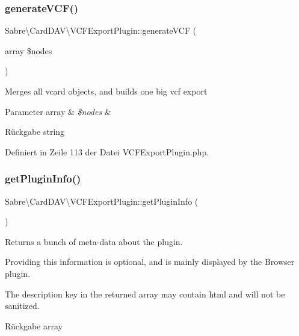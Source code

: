 \subsubsection{\texorpdfstring{generate\+V\+C\+F()}{generateVCF()}}
{\footnotesize\ttfamily Sabre\textbackslash{}\+Card\+D\+A\+V\textbackslash{}\+V\+C\+F\+Export\+Plugin\+::generate\+V\+CF (\begin{DoxyParamCaption}\item[{array}]{\$nodes }\end{DoxyParamCaption})}

Merges all vcard objects, and builds one big vcf export


\begin{DoxyParams}[1]{Parameter}
array & {\em \$nodes} & \\
\hline
\end{DoxyParams}
\begin{DoxyReturn}{Rückgabe}
string 
\end{DoxyReturn}


Definiert in Zeile 113 der Datei V\+C\+F\+Export\+Plugin.\+php.

\mbox{\label{class_sabre_1_1_card_d_a_v_1_1_v_c_f_export_plugin_ae5624d8d7cdd02424e6b128fc6545361}} 
\subsubsection{\texorpdfstring{get\+Plugin\+Info()}{getPluginInfo()}}
{\footnotesize\ttfamily Sabre\textbackslash{}\+Card\+D\+A\+V\textbackslash{}\+V\+C\+F\+Export\+Plugin\+::get\+Plugin\+Info (\begin{DoxyParamCaption}{ }\end{DoxyParamCaption})}

Returns a bunch of meta-\/data about the plugin.

Providing this information is optional, and is mainly displayed by the Browser plugin.

The description key in the returned array may contain html and will not be sanitized.

\begin{DoxyReturn}{Rückgabe}
array 
\end{DoxyReturn}


